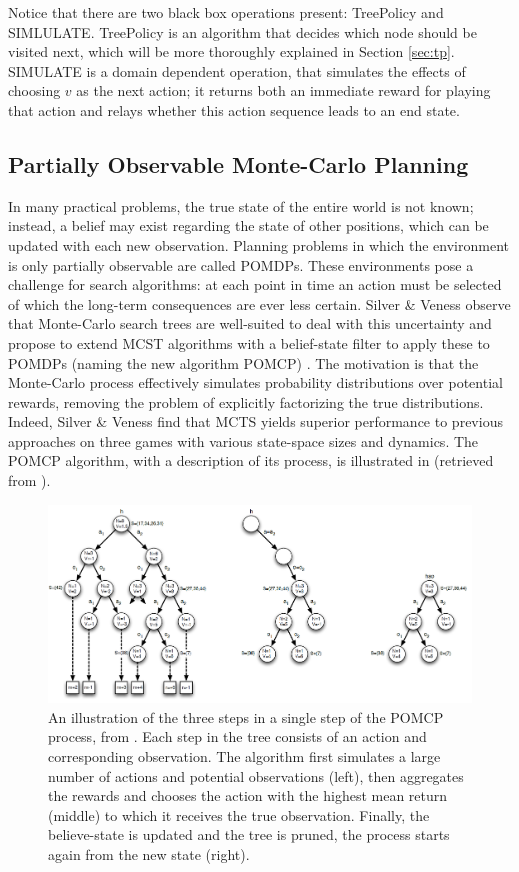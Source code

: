 Notice that there are two black box operations present: TreePolicy and SIMLULATE. TreePolicy is an algorithm that decides which node should be visited next, which will be more thoroughly explained in Section \ref{sec:tp}. SIMULATE is a domain dependent operation, that simulates the effects of choosing $v$ as the next action; it returns both an immediate reward for playing that action and relays whether this action sequence leads to an end state.



\subsection{Partially Observable Monte-Carlo Planning}
In many practical problems, the true state of the entire world is not known; instead, a belief may exist regarding the state of other positions, which can be updated with each new observation. Planning problems in which the environment is only partially observable are called POMDPs. These environments pose a challenge for search algorithms: at each point in time an action must be selected of which the long-term consequences are ever less certain. Silver \& Veness observe that Monte-Carlo search trees are well-suited to deal with this uncertainty and propose to extend MCST algorithms with a belief-state filter to apply these to POMDPs (naming the new algorithm POMCP) \cite{silver2010monte}. The motivation is that the Monte-Carlo process effectively simulates probability distributions over potential rewards, removing the problem of explicitly factorizing the true distributions. Indeed, Silver \& Veness find that MCTS yields superior performance to previous approaches on three games with various state-space sizes and dynamics. The POMCP algorithm, with a description of its process, is illustrated in  (retrieved from \cite{silver2010monte}). 

\begin{figure}[ht!]
\includegraphics[width=\linewidth]{pomdp.png}
\caption{An illustration of the three steps in a single step of the POMCP process, from \cite{silver2010monte}. Each step in the tree consists of an action and corresponding observation. The algorithm first simulates a large number of actions and potential observations (left), then aggregates the rewards and chooses the action with the highest mean return (middle) to which it receives the true observation. Finally, the believe-state is updated and the tree is pruned, the process starts again from the new state (right).}
\label{fig:pomcp}
\end{figure}
